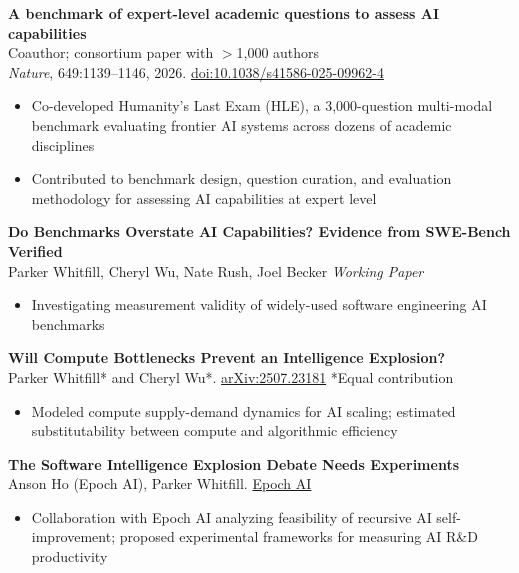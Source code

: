 \documentclass[11pt,letterpaper]{article}
\begin{document}
\textbf{A benchmark of expert-level academic questions to assess AI capabilities} \\
Coauthor; consortium paper with $>$1{,}000 authors \\
\textit{Nature}, 649:1139--1146, 2026. \href{https://www.nature.com/articles/s41586-025-09962-4}{doi:10.1038/s41586-025-09962-4}
\begin{itemize}
    \item Co-developed Humanity's Last Exam (HLE), a 3{,}000-question multi-modal benchmark evaluating frontier AI systems across dozens of academic disciplines
    \item Contributed to benchmark design, question curation, and evaluation methodology for assessing AI capabilities at expert level
\end{itemize}

\vspace{4pt}

\textbf{Do Benchmarks Overstate AI Capabilities? Evidence from SWE-Bench Verified} \\
Parker Whitfill, Cheryl Wu, Nate Rush, Joel Becker \hfill \textit{Working Paper}
\begin{itemize}
    \item Investigating measurement validity of widely-used software engineering AI benchmarks
\end{itemize}

\vspace{4pt}

\textbf{Will Compute Bottlenecks Prevent an Intelligence Explosion?} \\
Parker Whitfill* and Cheryl Wu*. \href{https://arxiv.org/abs/2507.23181}{arXiv:2507.23181} \hfill \footnotesize{*Equal contribution}
\begin{itemize}
    \item Modeled compute supply-demand dynamics for AI scaling; estimated substitutability between compute and algorithmic efficiency
\end{itemize}

\vspace{4pt}

\textbf{The Software Intelligence Explosion Debate Needs Experiments} \\
Anson Ho (Epoch AI), Parker Whitfill. \href{https://epoch.ai/gradient-updates/the-software-intelligence-explosion-debate-needs-experiments}{Epoch AI}
\begin{itemize}
    \item Collaboration with Epoch AI analyzing feasibility of recursive AI self-improvement; proposed experimental frameworks for measuring AI R\&D productivity
\end{itemize}
\end{document}

